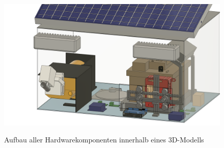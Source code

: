 \begin{figure}[H]
    \centering
    \includegraphics[width=\textwidth]{images/whole_box.png}
    \label{fig:whole_thing}
    \caption{Aufbau aller Hardwarekomponenten innerhalb eines 3D-Modells}
\end{figure}
